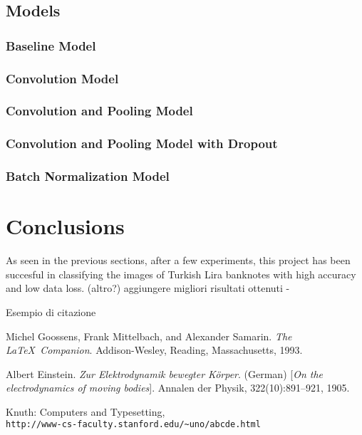 \documentclass[a4paper,12pt]{article}
\begin{document}
\newcommand{\bat}{Batch Norm.(\texttt{BatchN.})}
\subsection{Models}

\subsubsection{Baseline Model}


\subsubsection{Convolution Model}


\subsubsection{Convolution and Pooling Model}


\subsubsection{Convolution and Pooling Model with Dropout}


\subsubsection{Batch Normalization Model}








\newpage
\section{Conclusions}
As seen in the previous sections, after a few experiments, this project has been succesful in classifying the images of Turkish 
Lira banknotes with high accuracy and low data loss.
(altro?) aggiungere migliori risultati ottenuti - 




Esempio di citazione\cite{latexcompanion}

\newpage
{}
\begin{thebibliography}{9}
Michel Goossens, Frank Mittelbach, and Alexander Samarin. 
\textit{The \LaTeX\ Companion}. 
Addison-Wesley, Reading, Massachusetts, 1993.

Albert Einstein. 
\textit{Zur Elektrodynamik bewegter K{\"o}rper}. (German) 
[\textit{On the electrodynamics of moving bodies}]. 
Annalen der Physik, 322(10):891–921, 1905.

Knuth: Computers and Typesetting,
\\\texttt{http://www-cs-faculty.stanford.edu/\~{}uno/abcde.html}
\end{thebibliography}
\end{document}
